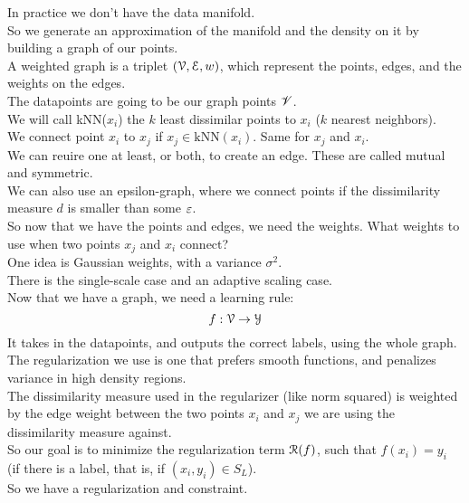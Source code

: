 \documentclass[12pt]{article}
\begin{document}
In practice we don't have the data manifold. \\
So we generate an approximation of the manifold
and the density on it by building a graph of our
points. \\

A weighted graph is a triplet $(\mathcal{V}, \mathcal{E}, w)$,
which represent the points, edges, and the weights
on the edges. \\

The datapoints are going to be our graph points $\mathscr{V}$. \\

We will call kNN($x_i$) the $k$ least dissimilar
points to $x_i$ ($k$ nearest neighbors). \\

We connect point $x_i$ to $x_j$ if $x_j \in 
\text{kNN}(x_i)$.
Same for $x_j$ and $x_i$. \\
We can reuire one at least, or both, to create
an edge. These are called mutual and symmetric. \\

We can also use an epsilon-graph, where
we connect points if the dissimilarity measure
$d$ is smaller than some $\varepsilon$. \\

So now that we have the points and edges, we need
the weights. What weights to use when two points
$x_j$ and $x_i$ connect? \\

One idea is Gaussian weights, with a variance
$\sigma^2$. \\
There is the single-scale case and an adaptive
scaling case. \\

Now that we have a graph, we need a learning
rule:
\[ f: \mathcal{V} \to \mathcal{Y} \]
It takes in the datapoints, and outputs
the correct labels, using the whole graph. \\

The regularization we use is one that prefers smooth
functions, and penalizes variance in high density
regions. \\
The dissimilarity measure used in the
regularizer (like norm squared) is weighted by
the edge weight between the two points
$x_i$ and $x_j$ we are using the dissimilarity
measure against. \\

So our goal is to minimize the regularization
term $\mathcal{R}(f)$, such that $f(x_i) = y_i$
(if there is a label, that is,
if $(x_i, y_i) \in S_L$). \\
So we have a regularization and constraint. \\
\end{document}
